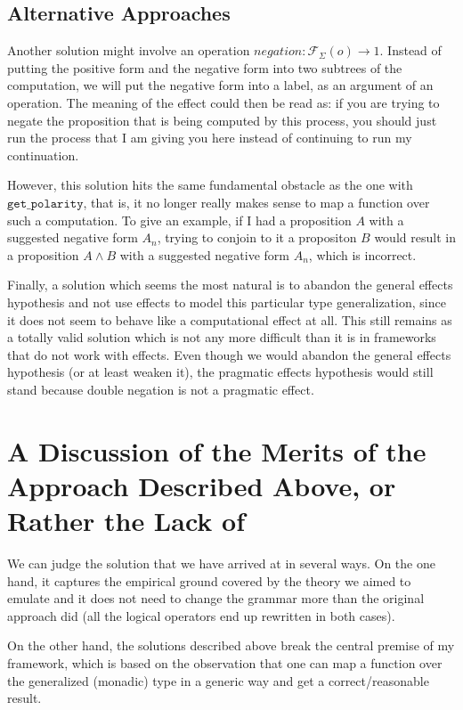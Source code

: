 \documentclass[a4paper,11pt,DIV=12]{scrartcl}
\begin{document}
\subsection{Alternative Approaches}

Another solution might involve an operation $negation :
\mathcal{F}_{\Sigma}(o) \to 1$. Instead of putting the positive form and
the negative form into two subtrees of the computation, we will put the
negative form into a label, as an argument of an operation. The meaning of
the effect could then be read as: if you are trying to negate the
proposition that is being computed by this process, you should just run the
process that I am giving you here instead of continuing to run my
continuation.

However, this solution hits the same fundamental obstacle as the one with
$\texttt{get\_polarity}$, that is, it no longer really makes sense to map a
function over such a computation. To give an example, if I had a
proposition $A$ with a suggested negative form $A_n$, trying to conjoin to
it a propositon $B$ would result in a proposition $A \land B$ with a
suggested negative form $A_n$, which is incorrect.

Finally, a solution which seems the most natural is to abandon the general
effects hypothesis and not use effects to model this particular type
generalization, since it does not seem to behave like a computational
effect at all. This still remains as a totally valid solution which is not
any more difficult than it is in frameworks that do not work with
effects. Even though we would abandon the general effects hypothesis (or at
least weaken it), the pragmatic effects hypothesis would still stand
because double negation is not a pragmatic effect.

\section{A Discussion of the Merits of the Approach Described Above, or
  Rather the Lack of}

We can judge the solution that we have arrived at in several ways. On the
one hand, it captures the empirical ground covered by the theory we aimed
to emulate and it does not need to change the grammar more than the
original approach did (all the logical operators end up rewritten in both
cases).

On the other hand, the solutions described above break the central premise
of my framework, which is based on the observation that one can map a
function over the generalized (monadic) type in a generic way and get a
correct/reasonable result.
\end{document}
